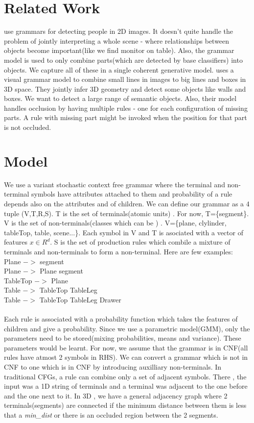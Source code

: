\documentclass[11pt]{article} %
\begin{document}
\section{Related Work}
\cite{girshick2011object} use grammars for detecting people in 2D images. It doesn't quite handle the problem of jointly interpreting a whole scene - where relationships between objects become important(like we find monitor on table). Also, the grammar model is used to only combine parts(which are detected by base classifiers) into objects. We capture all of these in a single coherent generative model.
\cite{zhu2011} uses a visual grammar model to combine small lines in images to big lines and boxes in 3D space. They jointly infer 3D geometry and detect some objects like walls and boxes. We want to detect a large range of semantic objects. Also, their model handles occlusion by having multiple rules - one for each configuration of missing parts. A rule with missing part might be invoked when the position for that part is not occluded.
\section{Model}
We use a variant stochastic context free grammar where the terminal and non-terminal symbols have attributes attached to them and probability of a rule depends also on the attributes and of children. We can define our grammar as a 4 tuple (V,T,R,S). T is the set of terminals(atomic units) . For now, T=\{segment\}. V is the set of non-terminals(classes which can be ) . V=\{plane, clylinder, tableTop, table, scene...\}. Each symbol in V and T is asociated with a vector of features $x \in R^d$.
S is the set of production rules which combile a mixture of terminals and non-terminals to form a non-terminal. Here are few examples: \\
Plane $->$ segment\\
Plane $->$ Plane segment\\
TableTop $->$  Plane\\
Table  $->$ TableTop TableLeg\\
Table  $->$ TableTop TableLeg Drawer\\
\\
Each rule is associated with a probability function which takes the features of children and give a probability. Since we use a parametric model(GMM), only the parameters need to be stored(mixing probabilities, means and variance). These parameters would be learnt. For now, we assume that the grammar is in CNF(all rules have atmost 2 symbols in RHS). We can convert a grammar which is not in CNF to one which is in CNF by introducing auxilliary non-terminals.
In traditional CFGs, a rule can combine only a set of adjacent symbols. There , the input was a 1D string of terminals and a terminal was adjacent to the one before and the one next to it. In 3D , we have a general adjacency graph where 2 terminals(segments) are connected if the minimum distance between them is less that a {\it min\_dist} or there is an occluded region between the 2 segments.
\end{document}
